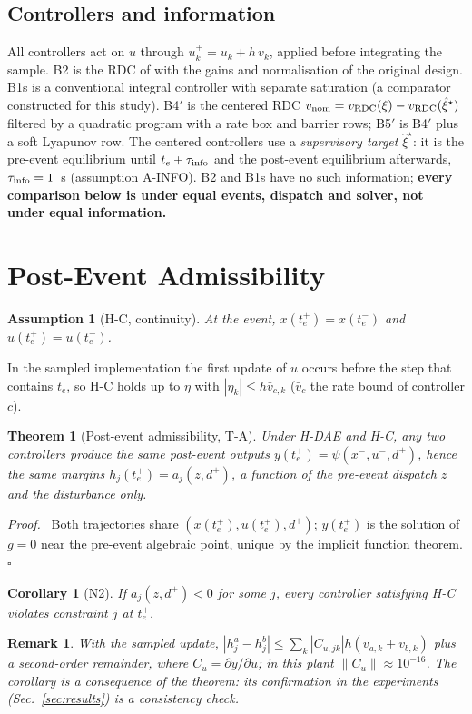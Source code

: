 \documentclass[11pt,twocolumn]{article}
\newtheorem{theorem}{Theorem}
\newtheorem{corollary}{Corollary}
\newtheorem{remark}{Remark}
\newtheorem{assumption}{Assumption}
\newenvironment{proof}{\par\noindent\textit{Proof.}\ }{\hfill$\square$\par}
\begin{document}
\subsection{Controllers and information}
\label{sec:controllers}
All controllers act on $u$ through $u_{k}^{+}=u_k+h\,v_k$, applied before integrating the sample. B2 is the RDC of \cite{Kavvathas2025Resilient} with the gains and normalisation of the original design. B1s is a conventional integral controller with separate saturation (a comparator constructed for this study). B4$'$ is the centered RDC $v_{\rm nom}=v_{\rm RDC}(\xi)-v_{\rm RDC}(\hat\xi^\star)$ filtered by a quadratic program with a rate box and barrier rows; B5$'$ is B4$'$ plus a soft Lyapunov row. The centered controllers use a \emph{supervisory target} $\hat\xi^\star$: it is the pre-event equilibrium until $t_e+\tau_{\rm info}$ and the post-event equilibrium afterwards, $\tau_{\rm info}=1$~s (assumption A-INFO). B2 and B1s have no such information; \textbf{every comparison below is under equal events, dispatch and solver, not under equal information.}

\section{Post-Event Admissibility}
\label{sec:ta}
\begin{assumption}[H-C, continuity]
At the event, $x(t_e^+)=x(t_e^-)$ and $u(t_e^+)=u(t_e^-)$.
\end{assumption}
In the sampled implementation the first update of $u$ occurs before the step that contains $t_e$, so H-C holds up to $\eta$ with $|\eta_k|\le h\bar v_{c,k}$ ($\bar v_c$ the rate bound of controller $c$).

\begin{theorem}[Post-event admissibility, T-A]
\label{thm:ta}
Under H-DAE and H-C, any two controllers produce the same post-event outputs $y(t_e^+)=\psi(x^-,u^-,d^+)$, hence the same margins $h_j(t_e^+)=a_j(z,d^+)$, a function of the pre-event dispatch $z$ and the disturbance only.
\end{theorem}
\begin{proof}
Both trajectories share $(x(t_e^+),u(t_e^+),d^+)$; $y(t_e^+)$ is the solution of $g=0$ near the pre-event algebraic point, unique by the implicit function theorem.
\end{proof}
\begin{corollary}[N2]
If $a_j(z,d^+)<0$ for some $j$, every controller satisfying H-C violates constraint $j$ at $t_e^+$.
\end{corollary}
\begin{remark}
With the sampled update, $|h_j^a-h_j^b|\le\sum_k|C_{u,jk}|h(\bar v_{a,k}+\bar v_{b,k})$ plus a second-order remainder, where $C_u=\partial y/\partial u$; in this plant $\|C_u\|\approx10^{-16}$. The corollary is a consequence of the theorem: its confirmation in the experiments (Sec.~\ref{sec:results}) is a consistency check.
\end{remark}
\end{document}
